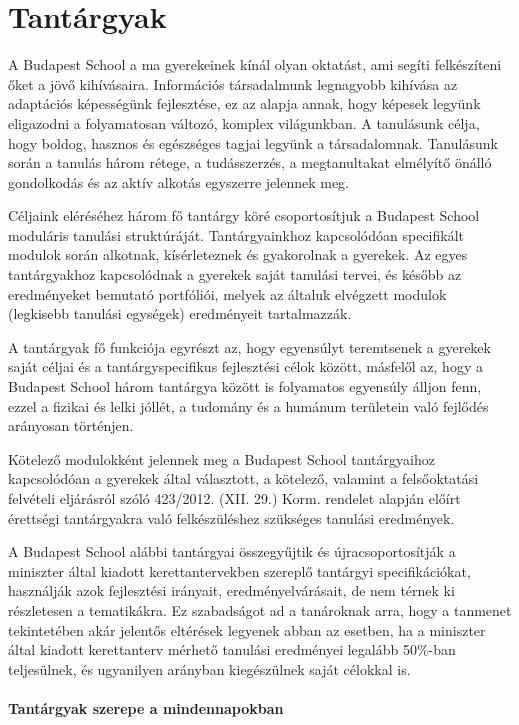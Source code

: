 \section{Tantárgyak}
\label{sec:tantargyak}
A Budapest School a ma gyerekeinek kínál olyan oktatást, ami segíti
felkészíteni őket a jövő kihívásaira. Információs társadalmunk legnagyobb
kihívása az adaptációs képességünk fejlesztése, ez az alapja annak, hogy
képesek legyünk eligazodni a folyamatosan változó, komplex világunkban. A
tanulásunk célja, hogy boldog, hasznos és egészséges tagjai legyünk a
társadalomnak. Tanulásunk során a tanulás három rétege, a tudásszerzés, a
megtanultakat elmélyítő önálló gondolkodás és az aktív alkotás egyszerre
jelennek meg. 

Céljaink eléréséhez három fő tantárgy köré csoportosítjuk a
Budapest School moduláris tanulási struktúráját. Tantárgyainkhoz kapcsolódóan
specifikált modulok során alkotnak, kísérleteznek és gyakorolnak a gyerekek. Az egyes tantárgyakhoz kapcsolódnak a gyerekek saját tanulási
tervei, és később az eredményeket bemutató portfóliói, melyek az általuk
elvégzett modulok (legkisebb tanulási egységek) eredményeit tartalmazzák.

A tantárgyak fő funkciója egyrészt az, hogy egyensúlyt teremtsenek a gyerekek
saját céljai és a tantárgyspecifikus fejlesztési célok között, másfelől az,
hogy a Budapest School három tantárgya között is folyamatos egyensúly álljon
fenn, ezzel a fizikai és lelki jóllét, a tudomány és a humánum területein való
fejlődés arányosan történjen.

Kötelező modulokként jelennek meg a Budapest School tantárgyaihoz kapcsolódóan
a gyerekek által választott, a kötelező, valamint a felsőoktatási felvételi
eljárásról szóló 423/2012. (XII. 29.) Korm. rendelet alapján előírt érettségi
tantárgyakra való felkészüléshez szükséges tanulási eredmények.

A Budapest School alábbi tantárgyai összegyűjtik és újracsoportosítják a
miniszter által kiadott kerettantervekben szereplő tantárgyi specifikációkat,
használják azok fejlesztési irányait, eredményelvárásait, de nem térnek ki
rész\-letesen a tematikákra. Ez szabadságot ad a tanároknak arra, hogy a
tanmenet tekintetében akár jelentős eltérések legyenek abban az esetben, ha a
miniszter által kiadott kerettanterv mérhető tanulási eredményei legalább 50\%-ban
teljesülnek, és ugyanilyen arányban kiegészülnek saját célokkal is.

\paragraph{Tantárgyak szerepe a mindennapokban}

